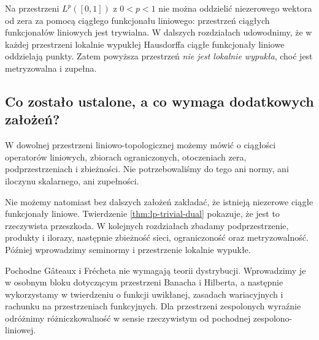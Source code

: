 \begin{uwaga}\label{rem:local-convexity-purpose}
Na przestrzeni $L^p([0,1])$ z $0<p<1$ nie można oddzielić
niezerowego wektora od zera za pomocą ciągłego funkcjonału
liniowego: przestrzeń ciągłych funkcjonałów liniowych jest trywialna.
W dalszych
rozdziałach udowodnimy, że w każdej przestrzeni lokalnie
wypukłej Hausdorffa ciągłe funkcjonały liniowe oddzielają
punkty. Zatem powyższa przestrzeń \emph{nie jest lokalnie wypukła},
choć jest metryzowalna i zupełna.
\end{uwaga}

\subsection{Co zostało ustalone, a co wymaga dodatkowych założeń?}

W dowolnej przestrzeni liniowo-topologicznej możemy mówić o
ciągłości operatorów liniowych, zbiorach ograniczonych, otoczeniach
zera, podprzestrzeniach i zbieżności. Nie potrzebowaliśmy do tego
ani normy, ani iloczynu skalarnego, ani zupełności.

Nie możemy natomiast bez dalszych założeń zakładać, że istnieją
niezerowe ciągłe funkcjonały liniowe. Twierdzenie
\ref{thm:lp-trivial-dual} pokazuje, że jest to rzeczywista
przeszkoda. W kolejnych rozdziałach zbadamy podprzestrzenie, produkty
i ilorazy, następnie zbieżność sieci, ograniczoność oraz
metryzowalność. Później wprowadzimy seminormy i przestrzenie
lokalnie wypukłe.

\begin{uwaga}
Pochodne Gâteaux i Frécheta nie wymagają teorii dystrybucji.
Wprowadzimy je w osobnym bloku dotyczącym przestrzeni Banacha
i Hilberta, a następnie wykorzystamy w twierdzeniu o funkcji
uwikłanej, zasadach wariacyjnych i rachunku na przestrzeniach
funkcyjnych. Dla przestrzeni zespolonych wyraźnie odróżnimy
różniczkowalność w sensie rzeczywistym od pochodnej
zespolono-liniowej.
\end{uwaga}
